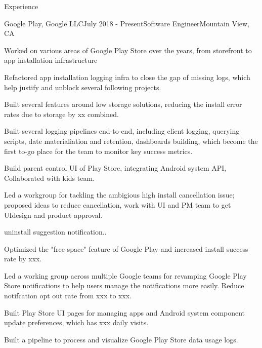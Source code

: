 \documentclass{resume} %
\begin{document}
\begin{rSection}{Experience}

\begin{rSubsection}{Google Play, Google LLC}{July 2018 - Present}{Software Engineer}{Mountain View, CA}
\item Worked on various areas of Google Play Store over the years, from storefront to app installation infrastructure
\item Refactored app installation logging infra to close the gap of missing logs, which help justify and unblock several following projects.
\item Built several features around low storage solutions, reducing the install error rates due to storage by xx  combined.
\item Built several logging pipelines end-to-end, including client logging, querying scripts, date materialiation and retention, dashboards building, which become the first to-go place for the team to monitor key success metrics.
\item Build parent control UI of Play Store, integrating Android system API, Collaborated with kids team.
\item Led a workgroup for tackling the ambigious high install cancellation issue; proposed ideas to reduce cancellation, work with UI and PM team to get UIdesign and product approval. 
\item uninstall suggestion notification..
\item Optimized the "free space" feature of Google Play and increased install success rate by xxx. 
\item Led a working group across multiple Google teams for revamping Google Play Store notifications to help users manage the notifications more easily. Reduce notifcation opt out rate from xxx to xxx.
\item Built Play Store UI pages for managing apps and Android system component update preferences, which has xxx daily visits.
\item Built a pipeline to process and visualize Google Play Store data usage logs.
\end{rSubsection}


\end{rSection}
\end{document}
